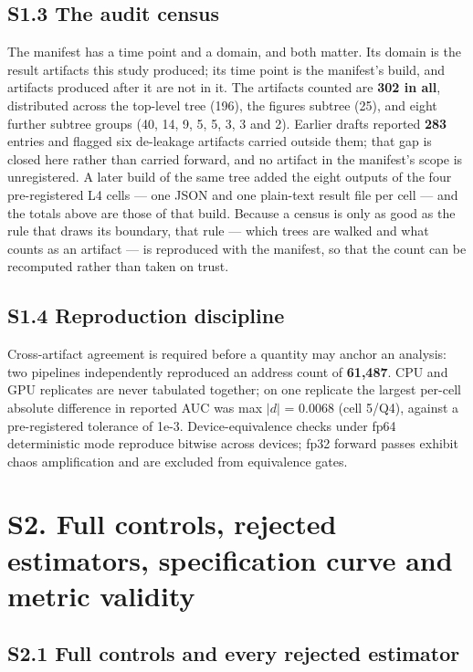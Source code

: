 \documentclass[11pt,a4paper]{article}
\begin{document}
\subsection*{S1.3 The audit census}

The manifest has a time point and a domain, and both matter. Its domain is the
result artifacts this study produced; its time point is the manifest's build,
and artifacts produced after it are not in it. The artifacts counted are
\textbf{302 in all}, distributed across the top-level tree (196), the figures
subtree (25), and eight further subtree groups (40, 14, 9, 5, 5, 3, 3 and 2).
Earlier drafts reported \textbf{283} entries and flagged six de-leakage
artifacts carried outside them; that gap is closed here rather than carried
forward, and no artifact in the manifest's scope is unregistered. A later build
of the same tree added the eight outputs of the four pre-registered L4 cells ---
one JSON and one plain-text result file per cell --- and the totals above are
those of that build. Because a census is only as good as the rule that draws its
boundary, that rule --- which trees are walked and what counts as an artifact ---
is reproduced with the manifest, so that the count can be recomputed rather than
taken on trust.

\subsection*{S1.4 Reproduction discipline}

Cross-artifact agreement is required before a quantity may anchor an analysis:
two pipelines independently reproduced an address count of \textbf{61,487}. CPU
and GPU replicates are never tabulated together; on one replicate the largest
per-cell absolute difference in reported AUC was max $|d|$ = 0.0068 (cell 5/Q4),
against a pre-registered tolerance of 1e-3. Device-equivalence checks under fp64
deterministic mode reproduce bitwise across devices; fp32 forward passes exhibit
chaos amplification and are excluded from equivalence gates.

\section*{S2. Full controls, rejected estimators, specification curve and
metric validity}

\subsection*{S2.1 Full controls and every rejected estimator}
\end{document}
